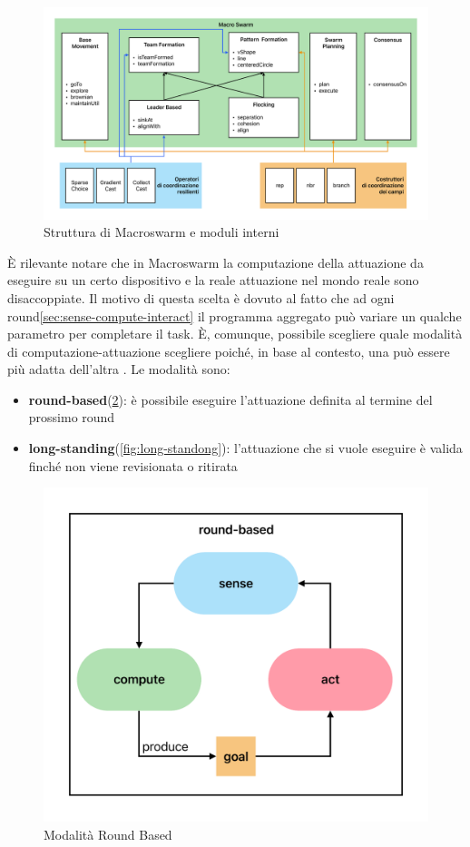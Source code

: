 \documentclass[12pt,a4paper,openright,twoside]{book}
\begin{document}
\begin{figure}
    \centering
    \includegraphics[width=.99\linewidth]{figures/macroSwarm-modeles.pdf}
    \caption{Struttura di Macroswarm e moduli interni}
    \label{fig:macro-swarm-int}
\end{figure}

È rilevante notare che in Macroswarm la computazione della attuazione da eseguire su un certo dispositivo e la reale attuazione nel mondo reale sono disaccoppiate. Il motivo di questa scelta è dovuto al fatto che ad ogni round\cref{sec:sense-compute-interact} il programma aggregato può variare un qualche parametro per completare il task. È, comunque, possibile scegliere quale modalità di computazione-attuazione scegliere poiché, in base al contesto, una può essere più adatta dell'altra \cite{Macroswarm}. Le modalità sono:

\begin{itemize}
    \item \textbf{round-based}(\cref{fig:round-based}): è possibile eseguire l'attuazione definita al termine del prossimo round 
    \item \textbf{long-standing}(\cref{fig:long-standong}): l'attuazione che si vuole eseguire è valida finché non viene revisionata o ritirata
\end{itemize}

\begin{figure}
    \centering
    \includegraphics[width=.6\linewidth]{figures/round-based.pdf}
    \caption{Modalità Round Based}
    \label{fig:round-based}
\end{figure}
\end{document}
